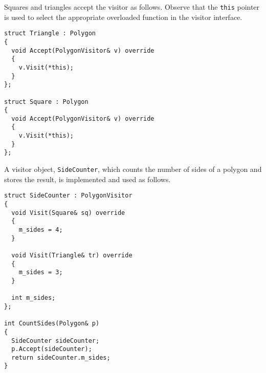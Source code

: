 \documentclass[10pt,a4paper,twocolumn]{article}
\newcommand\mycode[1]{{\small\texttt{#1}}}
\begin{document}
Squares and triangles accept the visitor as follows. Observe that the \mycode{this} pointer is used to select the appropriate overloaded function in the visitor interface.

{\small\begin{verbatim}
struct Triangle : Polygon
{
  void Accept(PolygonVisitor& v) override
  {
    v.Visit(*this);
  }
};

struct Square : Polygon
{
  void Accept(PolygonVisitor& v) override
  {
    v.Visit(*this);
  }
};
\end{verbatim}}

A visitor object, \mycode{SideCounter}, which counts the number of sides of a polygon and stores the result, is implemented and used as follows.

{\small\begin{verbatim}
struct SideCounter : PolygonVisitor
{
  void Visit(Square& sq) override
  {
    m_sides = 4;
  }
  
  void Visit(Triangle& tr) override
  {
    m_sides = 3;
  }
  
  int m_sides;
};

int CountSides(Polygon& p)
{
  SideCounter sideCounter;
  p.Accept(sideCounter);
  return sideCounter.m_sides;
}
\end{verbatim}}
\end{document}
